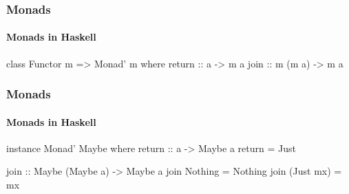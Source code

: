 \documentclass{beamer}
\begin{document}
\begin{frame}[fragile]
  \frametitle{Monads}
  \framesubtitle{Monads in Haskell}

  \begin{definition}
    \begin{code}
class Functor m => Monad' m where
  return :: a -> m a
  join   :: m (m a) -> m a
    \end{code}
  \end{definition}

\end{frame}


\begin{frame}[fragile]
  \frametitle{Monads}
  \framesubtitle{Monads in Haskell}

  \begin{example}
    \begin{code}
instance Monad' Maybe where
  return :: a -> Maybe a
  return = Just

  join :: Maybe (Maybe a) -> Maybe a
  join Nothing   = Nothing
  join (Just mx) = mx
    \end{code}
  \end{example}

\end{frame}

\end{document}

